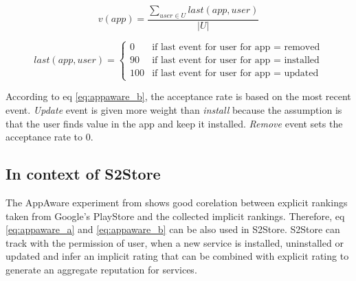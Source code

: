 \begin{equation}\label{eq:appaware_a}
  v(app)=\frac{\sum_{user \in U} last(app, user)}{|U|}
\end{equation}

\begin{equation}\label{eq:appaware_b}
  last(app,user) = \begin{cases}
    0 & \text{if last event for user for app = removed} \\
    90 & \text{if last event for user for app = installed} \\
    100 & \text{if last event for user for app = updated}
  \end{cases}
\end{equation}

According to eq \ref{eq:appaware_b}, the acceptance rate is based on the most recent event. \emph{Update} event is given more weight than \emph{install} because the assumption is that the user finds value in the app and keep it installed. \emph{Remove} event sets the acceptance rate to 0.

\subsection*{In context of S2Store}

The AppAware experiment from \cite{girardello2010explicit} shows good corelation between explicit rankings taken from Google's PlayStore and the collected implicit rankings. Therefore, eq \ref{eq:appaware_a} and \ref{eq:appaware_b} can be also used in S2Store. S2Store can track with the permission of user, when a new service is installed, uninstalled or updated and infer an implicit rating that can be combined with explicit rating to generate an aggregate reputation for services.